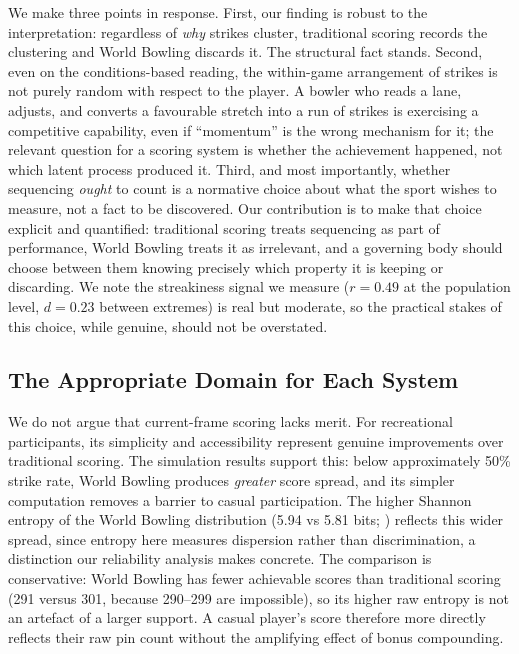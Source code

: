 \documentclass[USenglish]{article}
\theoremstyle{dgthm}
\theoremstyle{dgdef}
\begin{document}
We make three points in response. First, our finding is robust to the interpretation: regardless of \emph{why} strikes cluster, traditional scoring records the clustering and World Bowling discards it. The structural fact stands. Second, even on the conditions-based reading, the within-game arrangement of strikes is not purely random with respect to the player. A bowler who reads a lane, adjusts, and converts a favourable stretch into a run of strikes is exercising a competitive capability, even if ``momentum'' is the wrong mechanism for it; the relevant question for a scoring system is whether the achievement happened, not which latent process produced it. Third, and most importantly, whether sequencing \emph{ought} to count is a normative choice about what the sport wishes to measure, not a fact to be discovered. Our contribution is to make that choice explicit and quantified: traditional scoring treats sequencing as part of performance, World Bowling treats it as irrelevant, and a governing body should choose between them knowing precisely which property it is keeping or discarding. We note the streakiness signal we measure ($r = 0.49$ at the population level, $d = 0.23$ between extremes) is real but moderate, so the practical stakes of this choice, while genuine, should not be overstated.

\subsection{The Appropriate Domain for Each System}

We do not argue that current-frame scoring lacks merit. For recreational participants, its simplicity and accessibility represent genuine improvements over traditional scoring. The simulation results support this: below approximately 50\% strike rate, World Bowling produces \emph{greater} score spread, and its simpler computation removes a barrier to casual participation. The higher Shannon entropy of the World Bowling distribution (5.94 vs 5.81 bits; \citealp{shannon1948}) reflects this wider spread, since entropy here measures dispersion rather than discrimination, a distinction our reliability analysis makes concrete. The comparison is conservative: World Bowling has fewer achievable scores than traditional scoring (291 versus 301, because 290--299 are impossible), so its higher raw entropy is not an artefact of a larger support. A casual player's score therefore more directly reflects their raw pin count without the amplifying effect of bonus compounding.
\end{document}
